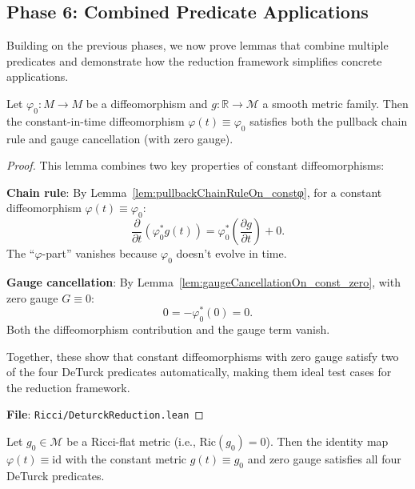 \subsection{Phase 6: Combined Predicate Applications}

Building on the previous phases, we now prove lemmas that combine multiple predicates and demonstrate how the reduction framework simplifies concrete applications.

\begin{lemma}
\label{lem:const_diff_satisfies_chain_and_gauge}
\leanok
Let $\varphi_0 : M \to M$ be a diffeomorphism and $g : \mathbb{R} \to \mathcal{M}$ a smooth metric family. Then the constant-in-time diffeomorphism $\varphi(t) \equiv \varphi_0$ satisfies both the pullback chain rule and gauge cancellation (with zero gauge).
\end{lemma}

\begin{proof}
\leanok
{}
This lemma combines two key properties of constant diffeomorphisms:

\textbf{Chain rule}: By Lemma~\ref{lem:pullbackChainRuleOn_constφ}, for a constant diffeomorphism $\varphi(t) \equiv \varphi_0$:
\[
\frac{\partial}{\partial t}(\varphi_0^* g(t)) = \varphi_0^*\left(\frac{\partial g}{\partial t}\right) + 0.
\]
The ``$\varphi$-part'' vanishes because $\varphi_0$ doesn't evolve in time.

\textbf{Gauge cancellation}: By Lemma~\ref{lem:gaugeCancellationOn_const_zero}, with zero gauge $G \equiv 0$:
\[
0 = -\varphi_0^*(0) = 0.
\]
Both the diffeomorphism contribution and the gauge term vanish.

Together, these show that constant diffeomorphisms with zero gauge satisfy two of the four DeTurck predicates automatically, making them ideal test cases for the reduction framework.

\textbf{File}: \texttt{Ricci/DeturckReduction.lean}
\end{proof}

\begin{lemma}
\label{lem:id_satisfies_all_predicates}
\leanok
Let $g_0 \in \mathcal{M}$ be a Ricci-flat metric (i.e., $\mathrm{Ric}(g_0) = 0$). Then the identity map $\varphi(t) \equiv \mathrm{id}$ with the constant metric $g(t) \equiv g_0$ and zero gauge satisfies all four DeTurck predicates.
\end{lemma}

